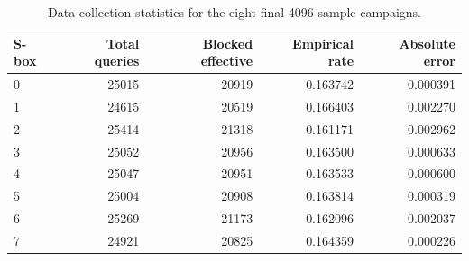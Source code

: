 \begin{table}[t]
\centering
\caption{Data-collection statistics for the eight final 4096-sample campaigns.}
\label{tab:s1-fixed-campaigns}
\begin{tabular}{lrrrr}
\toprule
S-box & Total queries & Blocked effective & Empirical rate & Absolute error \\
\midrule
0 & 25015 & 20919 & 0.163742 & 0.000391 \\
1 & 24615 & 20519 & 0.166403 & 0.002270 \\
2 & 25414 & 21318 & 0.161171 & 0.002962 \\
3 & 25052 & 20956 & 0.163500 & 0.000633 \\
4 & 25047 & 20951 & 0.163533 & 0.000600 \\
5 & 25004 & 20908 & 0.163814 & 0.000319 \\
6 & 25269 & 21173 & 0.162096 & 0.002037 \\
7 & 24921 & 20825 & 0.164359 & 0.000226 \\
\bottomrule
\end{tabular}
\end{table}
